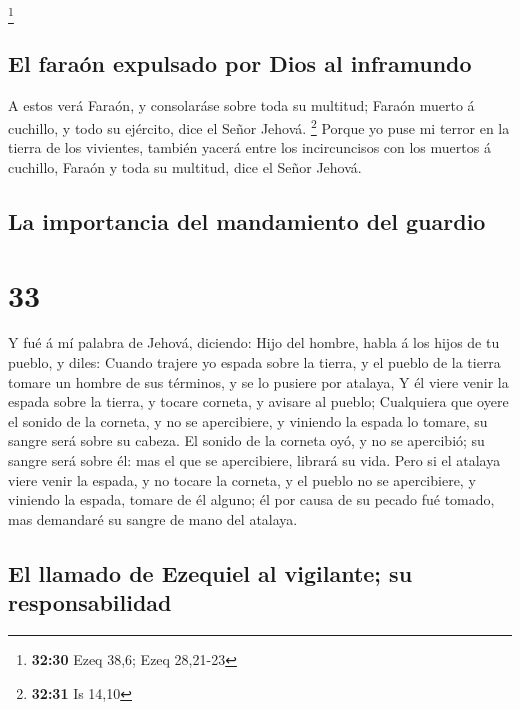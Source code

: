 \footnote{\textbf{32:30} Ezeq 38,6; Ezeq 28,21-23}

\hypertarget{el-farauxf3n-expulsado-por-dios-al-inframundo}{%
\subsection{El faraón expulsado por Dios al
inframundo}\label{el-farauxf3n-expulsado-por-dios-al-inframundo}}

 A estos verá Faraón, y consolaráse sobre toda su
multitud; Faraón muerto á cuchillo, y todo su ejército, dice el Señor
Jehová. \footnote{\textbf{32:31} Is 14,10}  Porque yo
puse mi terror en la tierra de los vivientes, también yacerá entre los
incircuncisos con los muertos á cuchillo, Faraón y toda su multitud,
dice el Señor Jehová.

\hypertarget{la-importancia-del-mandamiento-del-guardio}{%
\subsection{La importancia del mandamiento del
guardio}\label{la-importancia-del-mandamiento-del-guardio}}

\hypertarget{section-32}{%
\section{33}\label{section-32}}

 Y fué á mí palabra de Jehová, diciendo: 
Hijo del hombre, habla á los hijos de tu pueblo, y diles: Cuando trajere
yo espada sobre la tierra, y el pueblo de la tierra tomare un hombre de
sus términos, y se lo pusiere por atalaya,  Y él viere
venir la espada sobre la tierra, y tocare corneta, y avisare al pueblo;
 Cualquiera que oyere el sonido de la corneta, y no se
apercibiere, y viniendo la espada lo tomare, su sangre será sobre su
cabeza.  El sonido de la corneta oyó, y no se apercibió;
su sangre será sobre él: mas el que se apercibiere, librará su vida.
 Pero si el atalaya viere venir la espada, y no tocare la
corneta, y el pueblo no se apercibiere, y viniendo la espada, tomare de
él alguno; él por causa de su pecado fué tomado, mas demandaré su sangre
de mano del atalaya.

\hypertarget{el-llamado-de-ezequiel-al-vigilante-su-responsabilidad}{%
\subsection{El llamado de Ezequiel al vigilante; su
responsabilidad}\label{el-llamado-de-ezequiel-al-vigilante-su-responsabilidad}}

